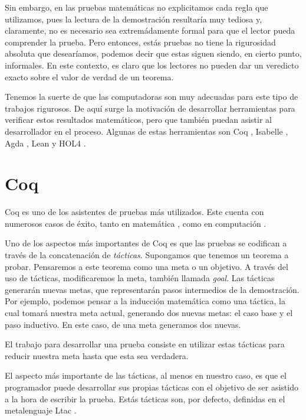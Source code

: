 Sin embargo, en las pruebas matemáticas no explicitamos cada regla que utilizamos, pues la lectura de la demostración resultaría muy tediosa y, claramente, no es necesario sea extremádamente formal para que el lector pueda comprender la prueba.
Pero entonces, estás pruebas no tiene la rigurosidad absoluta que desearíamos, podemos decir que estas siguen siendo, en cierto punto, informales.
En este contexto, es claro que los lectores no pueden dar un veredicto exacto sobre el valor de verdad de un teorema.

Tenemos la suerte de que las computadoras son muy adecuadas para este tipo de trabajos rigurosos. De aquí surge la motivación de desarrollar herramientas para verificar estos resultados matemáticos, pero que también puedan asistir al desarrollador en el proceso. Algunas de estas herramientas son Coq \cite{CIC}, Isabelle \cite{DBLP:books/sp/NipkowPW02}, Agda \cite{DBLP:conf/tphol/BoveDN09}, Lean \cite{DBLP:conf/cade/MouraKADR15} y HOL4 \cite{DBLP:conf/tphol/SlindN08}.

\section{Coq}

Coq es uno de los asistentes de pruebas más utilizados.
Este cuenta con numerosos casos de éxito, tanto en matemática \cite{DBLP:conf/ascm/Gonthier07}, como en computación \cite{DBLP:journals/pacmpl/0002JKD18}.

Uno de los aspectos más importantes de Coq es que las pruebas se codifican a través de la concatenación de \emph{tácticas}.
Supongamos que tenemos un teorema a probar.
Pensaremos a este teorema como una meta o un objetivo.
A través del uso de tácticas, modificaremos la meta, también llamada \emph{goal}.
Las tácticas generarán nuevas metas, que representarán pasos intermedios de la demostración.
Por ejemplo, podemos pensar a la inducción matemática como una táctica, la cual tomará nuestra meta actual, generando dos nuevas metas: el caso base y el paso inductivo. En este caso, de una meta generamos dos nuevas.

El trabajo para desarrollar una prueba consiste en utilizar estas tácticas para reducir nuestra meta hasta que esta sea verdadera.

El aspecto más importante de las tácticas, al menos en nuestro caso, es que el programador puede desarrollar sus propias tácticas con el objetivo de ser asistido a la hora de escribir la prueba.
Estás tácticas son, por defecto, definidas en el metalenguaje Ltac \cite{DBLP:conf/lpar/Delahaye00}.

